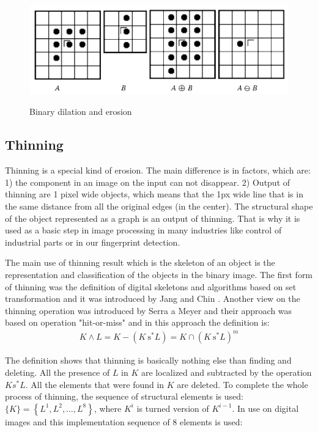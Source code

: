 \begin{figure}[H]
    \centering
        {\includegraphics[width=0.8\linewidth]{obrazky-figures/dil_ero.png}}\\
        \caption{Binary dilation and erosion \cite{shih2009image}}
        \label{fig:dil_morph}
\end{figure}

\subsection{Thinning} \label{thinnin}
Thinning is a special kind of erosion. The main difference is in factors, which are: 1) the component in an image on the input can not disappear. 2) Output of thinning are 1 pixel wide objects, which means that the 1px wide line that is in the same distance from all the original edges (in the center). The structural shape of the object represented as a graph is an output of thinning. That is why it is used as a basic step in image processing in many industries like control of industrial parts or in our fingerprint detection. \cite{shih2009image}

The main use of thinning result which is the skeleton of an object is the representation and classification of the objects in the binary image. The first form of thinning was the definition of digital skeletons and algorithms based on set transformation and it was introduced by Jang and Chin \cite{jang1990analysis}. Another view on the thinning operation was introduced by Serra a Meyer \cite{serra1983image} \cite{serra1988mathematical} and their approach was based on operation "hit-or-miss" and in this approach the definition is: 
\begin{align}
K \wedge L=K-\left(K \mathrm{~s}^{*} L\right)=K \cap\left(K \mathrm{~s}^{*} L\right)^{m}
\end{align}\cite{serra1988mathematical}

The definition shows that thinning is basically nothing else than finding and deleting. All the presence of $L$ in $K$ are localized and subtracted by the operation $K s^* L$. All the elements that were found in $K$ are deleted. To complete the whole process of thinning, the sequence of structural elements is used: $\{K\}=\left\{L^{1}, L^{2}, \ldots, L^{8}\right\}$, where $K^{i}$ is turned version of $K^{i-1}$. In use on digital images and this implementation sequence of 8 elements is used:\cite{serra1988mathematical}

